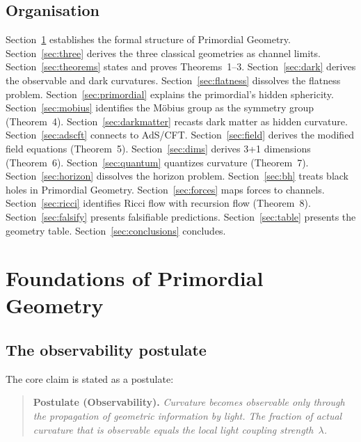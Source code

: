 \documentclass[prd,twocolumn,preprintnumbers,amsmath,amssymb]{revtex4-2}
\begin{document}
\subsection{Organisation}

Section~\ref{sec:foundations} establishes the formal structure of Primordial
Geometry.  Section~\ref{sec:three} derives the three classical geometries as
channel limits.  Section~\ref{sec:theorems} states and proves Theorems~1--3.
Section~\ref{sec:dark} derives the observable and dark curvatures.
Section~\ref{sec:flatness} dissolves the flatness problem.
Section~\ref{sec:primordial} explains the primordial's hidden sphericity.
Section~\ref{sec:mobius} identifies the Möbius group as the symmetry group
(Theorem~4).  Section~\ref{sec:darkmatter} recasts dark matter as hidden
curvature.  Section~\ref{sec:adscft} connects to AdS/CFT.
Section~\ref{sec:field} derives the modified field equations (Theorem~5).
Section~\ref{sec:dims} derives 3+1 dimensions (Theorem~6).
Section~\ref{sec:quantum} quantizes curvature (Theorem~7).
Section~\ref{sec:horizon} dissolves the horizon problem.
Section~\ref{sec:bh} treats black holes in Primordial Geometry.
Section~\ref{sec:forces} maps forces to channels.
Section~\ref{sec:ricci} identifies Ricci flow with recursion flow (Theorem~8).
Section~\ref{sec:falsify} presents falsifiable predictions.
Section~\ref{sec:table} presents the geometry table.
Section~\ref{sec:conclusions} concludes.

\section{Foundations of Primordial Geometry}
\label{sec:foundations}

\subsection{The observability postulate}

The core claim is stated as a postulate:

\begin{quote}
\textbf{Postulate (Observability).} \emph{Curvature becomes observable only
through the propagation of geometric information by light.  The fraction of
actual curvature that is observable equals the local light coupling
strength~$\lambda$.}
\end{quote}
\end{document}
